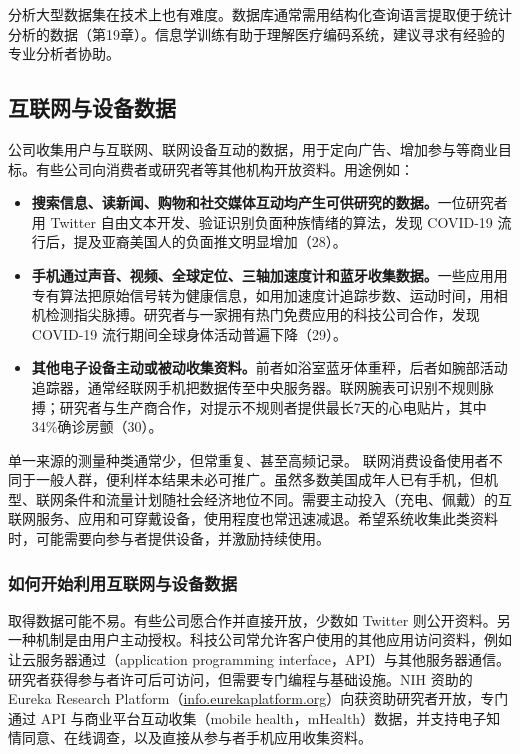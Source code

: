分析大型数据集在技术上也有难度。数据库通常需用结构化查询语言提取便于统计分析的数据（第19章）。信息学训练有助于理解医疗编码系统，建议寻求有经验的专业分析者协助。

\subsection{互联网与设备数据}
公司收集用户与互联网、联网设备互动的数据，用于定向广告、增加参与等商业目标。有些公司向消费者或研究者等其他机构开放资料。用途例如：
\begin{itemize}
\item \textbf{搜索信息、读新闻、购物和社交媒体互动均产生可供研究的数据。}一位研究者用 Twitter 自由文本开发、验证识别负面种族情绪的算法，发现 COVID-19 流行后，提及亚裔美国人的负面推文明显增加（28）。
\item \textbf{手机通过声音、视频、全球定位、三轴加速度计和蓝牙收集数据。}一些应用用专有算法把原始信号转为健康信息，如用加速度计追踪步数、运动时间，用相机检测指尖脉搏。研究者与一家拥有热门免费应用的科技公司合作，发现 COVID-19 流行期间全球身体活动普遍下降（29）。
\item \textbf{其他电子设备主动或被动收集资料。}前者如浴室蓝牙体重秤，后者如腕部活动追踪器，通常经联网手机把数据传至中央服务器。联网腕表可识别不规则脉搏；研究者与生产商合作，对提示不规则者提供最长7天的心电贴片，其中34\%确诊房颤（30）。
\end{itemize}

单一来源的测量种类通常少，但常重复、甚至高频记录。
联网消费设备使用者不同于一般人群，便利样本结果未必可推广。虽然多数美国成年人已有手机，但机型、联网条件和流量计划随社会经济地位不同。需要主动投入（充电、佩戴）的互联网服务、应用和可穿戴设备，使用程度也常迅速减退。希望系统收集此类资料时，可能需要向参与者提供设备，并激励持续使用。

\subsubsection{如何开始利用互联网与设备数据}
取得数据可能不易。有些公司愿合作并直接开放，少数如 Twitter 则公开资料。另一种机制是由用户主动授权。科技公司常允许客户使用的其他应用访问资料，例如让云服务器通过（application programming interface，API）与其他服务器通信。研究者获得参与者许可后可访问，但需要专门编程与基础设施。NIH 资助的 Eureka Research Platform（\url{info.eurekaplatform.org}）向获资助研究者开放，专门通过 API 与商业平台互动收集（mobile health，mHealth）数据，并支持电子知情同意、在线调查，以及直接从参与者手机应用收集资料。

